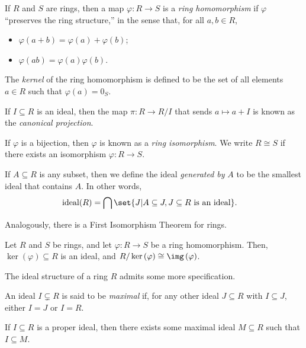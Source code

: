 \begin{definition}
  If $R$ and $S$ are rings, then a map $\varphi\colon R\rightarrow S$ is a \textit{ring homomorphism} if $\varphi$ ``preserves the ring structure,'' in the sense that, for all $a,b\in R$,
  \begin{itemize}
    \item $\varphi\left(a+b\right) = \varphi\left(a\right) + \varphi\left(b\right)$;
    \item $\varphi\left(ab\right) = \varphi\left(a\right)\varphi\left(b\right)$.
  \end{itemize}
  The \textit{kernel} of the ring homomorphism is defined to be the set of all elements $a\in R$ such that $\varphi\left(a\right) = 0_{S}$.\newline

  If $I \subseteq R$ is an ideal, then the map $\pi\colon R\rightarrow R/I$ that sends $a \mapsto a + I$ is known as the \textit{canonical projection}.\newline

  If $\varphi$ is a bijection, then $\varphi$ is known as a \textit{ring isomorphism}. We write $R\cong S$ if there exists an isomorphism $\varphi\colon R\rightarrow S$.

  If $A\subseteq R$ is any subset, then we define the ideal \textit{generated by} $A$ to be the smallest ideal that contains $A$. In other words,
  \begin{align*}
    \operatorname{ideal}(R) &= \bigcap\set{J | A\subseteq J,J\subseteq R\text{ is an ideal}}.
  \end{align*}
\end{definition}
Analogously, there is a First Isomorphism Theorem for rings.
\begin{theorem}
  Let $R$ and $S$ be rings, and let $\varphi\colon R\rightarrow S$ be a ring homomorphism. Then, $\ker\left(\varphi\right)\subseteq R$ is an ideal, and $R/\ker\left(\varphi\right)\cong \img\left(\varphi\right)$.
\end{theorem}
The ideal structure of a ring $R$ admits some more specification.
\begin{definition}
  An ideal $I\subsetneq R$ is said to be \textit{maximal} if, for any other ideal $J\subseteq R$ with $I\subseteq J$, either $I = J$ or $I = R$.
\end{definition}
\begin{theorem}
  If $I\subseteq R$ is a proper ideal, then there exists some maximal ideal $M\subseteq R$ such that $I\subseteq M$.
\end{theorem}
